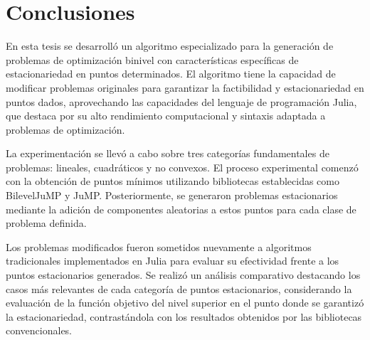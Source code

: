 \chapter{Conclusiones}

En esta tesis se desarrolló un algoritmo especializado para la generación de problemas de optimización binivel con características específicas de estacionariedad en puntos determinados. El algoritmo tiene la capacidad de modificar problemas originales para garantizar la factibilidad y estacionariedad en puntos dados, aprovechando las capacidades del lenguaje de programación Julia, que destaca por su alto rendimiento computacional y sintaxis adaptada a problemas de optimización.

La experimentación se llevó a cabo sobre tres categorías fundamentales de problemas: lineales, cuadráticos y no convexos. El proceso experimental comenzó con la obtención de puntos mínimos utilizando bibliotecas establecidas como BilevelJuMP y JuMP. Posteriormente, se generaron problemas estacionarios mediante la adición de componentes aleatorias a estos puntos para cada clase de problema definida.

Los problemas modificados fueron sometidos nuevamente a algoritmos tradicionales implementados en Julia para evaluar su efectividad frente a los puntos estacionarios generados. Se realizó un análisis comparativo destacando los casos más relevantes de cada categoría de puntos estacionarios, considerando la evaluación de la función objetivo del nivel superior en el punto donde se garantizó la estacionariedad, contrastándola con los resultados obtenidos por las bibliotecas convencionales.

